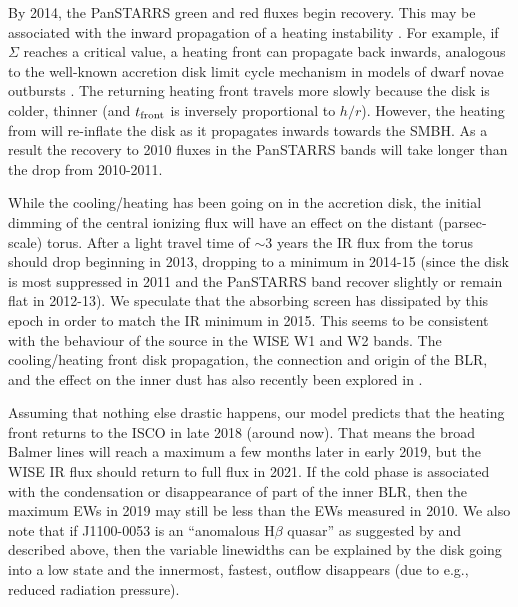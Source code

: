 \documentclass[a4paper,fleqn,usenatbib]{mnras}
\begin{document}
By 2014, the PanSTARRS green and red fluxes begin recovery. This may be associated with the inward propagation of a heating instability \citep{Hameury2009}. For example, if $\Sigma$ reaches a critical value, a heating front can propagate back inwards, analogous to the well-known accretion disk limit cycle mechanism in models of dwarf novae outbursts \citep[e.g.,][]{Cannizzo1998}. The returning heating front travels more slowly because the disk is colder, thinner (and $t_{\rm front}$ is inversely proportional to $h/r$). However, the heating from will re-inflate the disk as it propagates inwards towards the SMBH. As a result the recovery to 2010 fluxes in the PanSTARRS bands will take longer than the drop from 2010-2011. 

While the cooling/heating has been going on in the accretion disk, the initial dimming of the central ionizing flux will have an effect on the distant (parsec-scale) torus. After a light travel time of $\sim 3$ years the IR flux from the torus should drop \citep{Koshida2014, Jun2015} beginning in 2013, dropping to a minimum in 2014-15 (since the disk is most suppressed in 2011 and the PanSTARRS band recover slightly or remain flat in 2012-13). We speculate that the absorbing screen has dissipated by this epoch in order to match the IR minimum in 2015. This seems to be consistent with the behaviour of the source in the WISE W1 and W2 bands. The cooling/heating front disk propagation, the connection and origin of the BLR, and the effect on the inner dust has also recently been explored in \citet{Baskin_Laor2018}. 

Assuming that nothing else drastic happens, our model predicts that the heating front returns to the ISCO in late 2018 (around now). That means the broad Balmer lines will reach a maximum a few months later in early 2019, but the WISE IR flux should return to full flux in 2021. If the cold phase is associated with the condensation or disappearance of part of the inner BLR, then the maximum EWs in 2019 may still be less than the EWs measured in 2010.
We also note that if J1100-0053 is an ``anomalous H$\beta$ quasar'' as
suggested by \citet{Steinhardt_Silverman2013} and described above,
then the variable linewidths can be explained by the disk going into a
low state and the innermost, fastest, outflow disappears (due to e.g.,
reduced radiation pressure).
\end{document}
